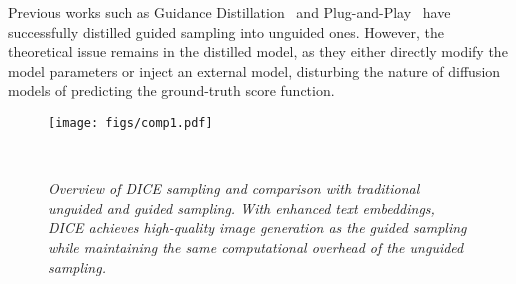Previous works such as Guidance Distillation~\cite{meng2023distillation} and Plug-and-Play~\cite{hsiao2024plug} have successfully distilled guided sampling into unguided ones. However, the theoretical issue remains in the distilled model, as they either directly modify the model parameters or inject an external model, disturbing the nature of diffusion models of predicting the ground-truth score function. %

\begin{figure}[t]
    \texttt{[image: figs/comp1.pdf]}
    \caption{\small \it Overview of DICE sampling and comparison with traditional unguided and guided sampling. With enhanced text embeddings, DICE achieves high-quality image generation as the guided sampling while maintaining the same computational overhead of the unguided sampling.}
    \label{fig:comparison}
~\vspace{-2em}
\end{figure}
